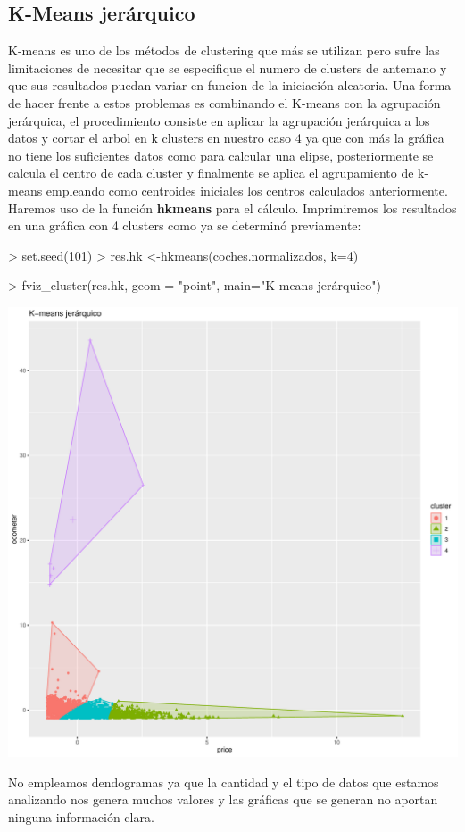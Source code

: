 \documentclass[a4paper]{article}
\begin{document}
\subsection{K-Means jerárquico}
K-means es uno de los métodos de clustering que más se utilizan pero sufre las limitaciones de necesitar que se especifique el numero de clusters de antemano y que sus resultados puedan variar en funcion de la iniciación aleatoria. Una forma de hacer frente a estos problemas es combinando el K-means con la agrupación jerárquica, el procedimiento consiste en aplicar la agrupación jerárquica a los datos y cortar el arbol en k clusters en nuestro caso 4 ya que con más la gráfica no tiene los suficientes datos como para calcular una elipse, posteriormente se calcula el centro de cada cluster y finalmente se aplica el agrupamiento de k-means empleando como centroides iniciales los centros calculados anteriormente. Haremos uso de la función \textbf{hkmeans} para el cálculo. Imprimiremos los resultados en una gráfica con 4 clusters como ya se determinó previamente:

\begin{Schunk}
\begin{Sinput}
> set.seed(101)
> res.hk <-hkmeans(coches.normalizados, k=4)
\end{Sinput}
\end{Schunk}
\begin{Schunk}
\begin{Sinput}
> fviz_cluster(res.hk, geom = "point", main="K-means jerárquico")
\end{Sinput}
\end{Schunk}
\includegraphics{Practica4-hk}

No empleamos dendogramas ya que la cantidad y el tipo de datos que estamos analizando nos genera muchos valores y las gráficas que se generan no aportan ninguna información clara.
\end{document}
